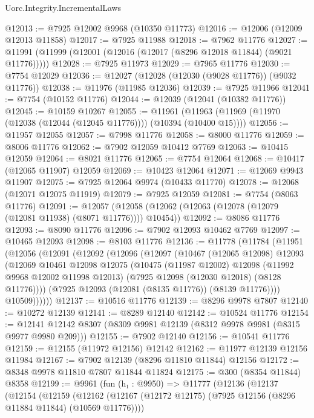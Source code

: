 \begin{lexlean}{Uorc.Integrity.IncrementalLaws}
\begin{coremodule}
@12013 := @7925 @12002 @9968 (@10350 @11773)
@12016 := @12006 (@12009 @12013 @11858)
@12017 := @7925 @11988
@12018 := @7962 @11776
@12027 := @11991 (@11999 (@12001 (@12016 (@12017 (@8296 @12018 @11844) (@9021 @11776)))))
@12028 := @7925 @11973
@12029 := @7965 @11776
@12030 := @7754 @12029
@12036 := @12027 (@12028 (@12030 (@9028 @11776)) (@9032 @11776))
@12038 := @11976 (@11985 @12036)
@12039 := @7925 @11966
@12041 := @7754 (@10152 @11776)
@12044 := @12039 (@12041 (@10382 @11776))
@12045 := @10159 @10267
@12055 := @11961 (@11963 (@11969 (@11970 (@12038 (@12044 (@12045 @11776)))) (@10394 (@10400 @15))))
@12056 := @11957 @12055
@12057 := @7998 @11776
@12058 := @8000 @11776
@12059 := @8006 @11776
@12062 := @7902 @12059 @10412 @7769
@12063 := @10415 @12059
@12064 := @8021 @11776
@12065 := @7754 @12064
@12068 := @10417 (@12065 @11907) @12059
@12069 := @10423 @12064
@12071 := @12069 @9943 @11907
@12075 := @7925 @12064 @9974 (@10433 @11770)
@12078 := @12068 (@12071 @12075 @11919)
@12079 := @7925 @12059
@12081 := @7754 (@8063 @11776)
@12091 := @12057 (@12058 (@12062 (@12063 (@12078 (@12079 (@12081 @11938) (@8071 @11776)))) @10454))
@12092 := @8086 @11776
@12093 := @8090 @11776
@12096 := @7902 @12093 @10462 @7769
@12097 := @10465 @12093
@12098 := @8103 @11776
@12136 := @11778
    (@11784
      (@11951
        (@12056
          (@12091
            (@12092
              (@12096
                (@12097
                  (@10467
                    (@12065 @12098)
                    @12093
                    (@12069
                      @10461
                      @12098
                      @12075
                      (@10475
                        (@11987 @12002)
                        @12098
                        (@11992 @9968 @12002 @11998 @12013)
                        (@7925 @12098 (@12030 @12018) (@8128 @11776))))
                    (@7925 @12093 (@12081 (@8135 @11776)) (@8139 @11776))))
                @10509))))))
@12137 := @10516 @11776
@12139 := @8296 @9978 @7807
@12140 := @10272 @12139
@12141 := @8289 @12140
@12142 := @10524 @11776
@12154 := @12141 @12142 @8307 (@8309 @9981 @12139 (@8312 @9978 @9981 (@8315 @9977 @9980 @209)))
@12155 := @7902 @12140
@12156 := @10541 @11776
@12159 := @12155 (@11972 @12156) @12142
@12162 := @11977 @12139 @12156 @11984
@12167 := @7902 @12139 (@8296 @11810 @11844) @12156
@12172 := @8348 @9978 @11810 @7807 @11844 @11824
@12175 := @300 (@8354 @11844) @8358
@12199 := @9961
    (fun (h₁ : @9950) =>
    @11777
      (@12136
        (@12137
          (@12154
            (@12159
              (@12162 (@12167 (@12172 @12175) (@7925 @12156 (@8296 @11884 @11844) (@10569 @11776))))

\end{coremodule}
\end{lexlean}
